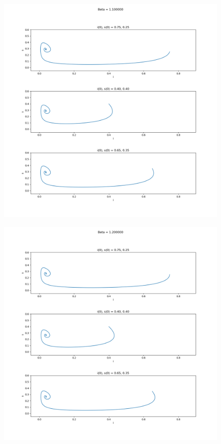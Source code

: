 \documentclass[11pt,a4paper]{CLabBookTemplate} %
\begin{document}
\begin{figure}[h!]
	\centering
	\includegraphics[width = 160mm]{Figures/Task1_2.png}
	\caption{}
	\label{fig:Task1_2}
\end{figure}

\begin{figure}[h!]
	\centering
	\includegraphics[width = 160mm]{Figures/Task1_3.png}
	\caption{}
	\label{fig:Task1_3}
\end{figure}
\end{document}
